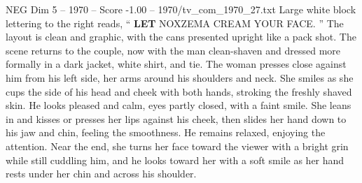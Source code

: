 \begin{textsample}{NEG Dim 5 – 1970 – Score -1.00 – 1970/tv\_com\_1970\_27.txt}
Large white block lettering to the right reads, “ \textbf{LET} NOXZEMA CREAM YOUR FACE. ” The layout is clean and graphic, with the cans presented upright like a pack shot.
The scene returns to the couple, now with the man clean-shaven and dressed more formally in a dark jacket, white shirt, and tie.
The woman presses close against him from his left side, her arms around his shoulders and neck.
She smiles as she cups the side of his head and cheek with both hands, stroking the freshly shaved skin.
He looks pleased and calm, eyes partly closed, with a faint smile.
She leans in and kisses or presses her lips against his cheek, then slides her hand down to his jaw and chin, feeling the smoothness.
He remains relaxed, enjoying the attention.
Near the end, she turns her face toward the viewer with a bright grin while still cuddling him, and he looks toward her with a soft smile as her hand rests under her chin and across his shoulder.

\end{textsample}
